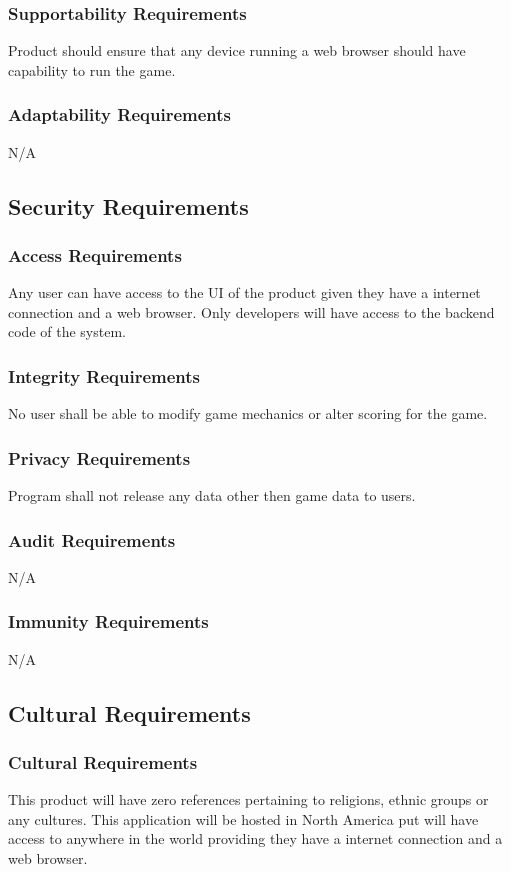 \documentclass[12pt, titlepage]{article}
\begin{document}
\subsubsection{Supportability Requirements}
Product should ensure that any device running a web browser should have capability to run the game.
\subsubsection{Adaptability Requirements}
N/A

\subsection{Security Requirements}
\subsubsection{Access Requirements}
Any user can have access to the UI of the product given they have a internet connection and a web browser. Only developers will have access to the backend code of the system.
\subsubsection{Integrity Requirements}
No user shall be able to modify game mechanics or alter scoring for the game.
\subsubsection{Privacy Requirements}
Program shall not release any data other then game data to users.
\subsubsection{Audit Requirements}
N/A
\subsubsection{Immunity Requirements}
N/A


\subsection{Cultural Requirements}
\subsubsection{Cultural Requirements}
This product will have zero references pertaining to religions, ethnic groups or any cultures. This application will be hosted in North America put will have access to anywhere in the world providing they have a internet connection and a web browser.
\end{document}
